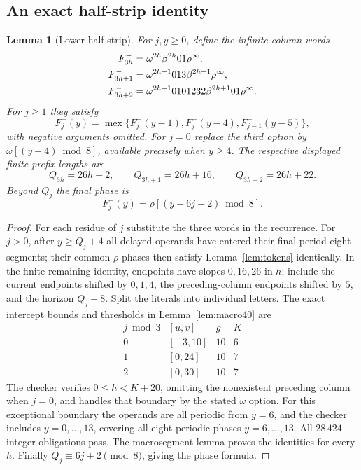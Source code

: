 \documentclass[11pt]{article}
\newtheorem{lemma}[theorem]{Lemma}
\theoremstyle{remark}\newtheorem{remark}[theorem]{Remark}
\DeclareMathOperator{\mex}{mex}
\begin{document}
\subsection{An exact half-strip identity}
\begin{lemma}[Lower half-strip]\label{lem:lower-halfstrip}
For $j,y\ge0$, define the infinite column words
\begin{align}
 F^-_{3h}&=\omega^{2h}\beta^{2h}01\rho^\infty,\notag\\
 F^-_{3h+1}&=\omega^{2h+1}013\beta^{2h+1}\rho^\infty,\label{eq:lower-columns}\\
 F^-_{3h+2}&=\omega^{2h+1}0101232\beta^{2h+1}01\rho^\infty.\notag
\end{align}
For $j\ge1$ they satisfy
\[
 F^-_j(y)=\mex\{F^-_j(y-1),F^-_j(y-4),F^-_{j-1}(y-5)\},
\]
with negative arguments omitted. For $j=0$ replace the third option by
$\omega[(y-4)\bmod8]$, available precisely when $y\ge4$.
The respective displayed finite-prefix lengths are
\[
 Q_{3h}=26h+2,\qquad Q_{3h+1}=26h+16,\qquad Q_{3h+2}=26h+22.
\]
Beyond $Q_j$ the final phase is
\begin{equation}\label{eq:lower-final-phase}
 F^-_j(y)=\rho[(y-6j-2)\bmod8].
\end{equation}
\end{lemma}
\begin{proof}
For each residue of $j$ substitute the three words in the recurrence.
For $j>0$, after $y\ge Q_j+4$ all delayed operands have entered their
final period-eight segments; their common $\rho$ phases then satisfy
Lemma~\ref{lem:tokens} identically. In the finite remaining
identity, endpoints have slopes $0,16,26$ in $h$; include the current
endpoints shifted by $0,1,4$, the preceding-column endpoints shifted by
$5$, and the horizon $Q_j+8$. Split the literals into individual letters.
The exact intercept bounds and thresholds in Lemma~\ref{lem:macro40} are
\[
\begin{array}{c|c|c|c}
 j\bmod3&[u,v]&g&K\\\hline
 0&[-3,10]&10&6\\
 1&[0,24]&10&7\\
 2&[0,30]&10&7
\end{array}
\]
The checker  verifies $0\le h<K+20$,
omitting the nonexistent preceding column when $j=0$, and handles that
boundary by the stated $\omega$ option. For this exceptional boundary
the operands are all periodic from $y=6$, and the checker includes
$y=0,\ldots,13$, covering all eight periodic phases $y=6,\ldots,13$.
All $28\,424$ integer obligations pass. The macrosegment lemma proves
the identities for every $h$.
Finally $Q_j\equiv6j+2\pmod8$, giving the phase formula.
\end{proof}
\end{document}
